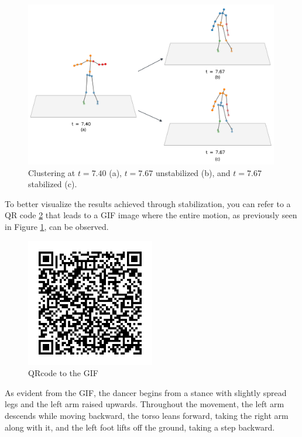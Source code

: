 \begin{figure}[H]
  \centering
  \includegraphics[width=0.99\textwidth]{graphics/ClustersStabilization.png}
  \caption{Clustering at $t=7.40$ (a), $t=7.67$ unstabilized (b), and $t=7.67$ stabilized (c).}
  \label{fig:stabilization_results}
\end{figure}

To better visualize the results achieved through stabilization, you can refer to a QR code \ref{fig:QRcode} that leads to a GIF image where the entire motion, as previously seen in Figure \ref{fig:stabilization_results}, can be observed.

\begin{figure}[H]
  \centering
  \includegraphics[width=0.50\textwidth]{graphics/qrcode.png}
  \caption{QRcode to the GIF}
  \label{fig:QRcode}
\end{figure}

As evident from the GIF, the dancer begins from a stance with slightly spread legs and the left arm raised upwards.
Throughout the movement, the left arm descends while moving backward, the torso leans forward, taking the right arm along with it, and the left foot lifts off the ground, taking a step backward.